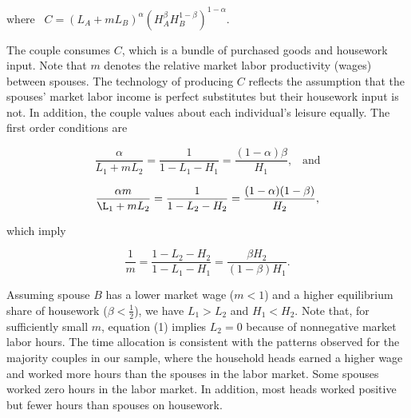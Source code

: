 \documentclass[12pt]{article}
\begin{document}
\begin{math}
\text{where} \;\;\; C = (L_A + mL_B)^\alpha(H_A^\beta H_B^{1-\beta})^{1-\alpha}.
\end{math}

The couple consumes $C$, which is a bundle of purchased goods and housework input. Note that $m$ denotes the relative market labor productivity (wages) between spouses. The technology of producing $C$ reflects the assumption that the spouses' market labor income is perfect substitutes but their housework input is not. In addition, the couple values about each individual's leisure equally. The first order conditions are

\begin{equation}
\frac{\alpha}{L_1 + mL_2} = \frac{1}{1 - L_1 - H_1} = \frac{(1-\alpha)\beta}{H_1}, \;\;\; \text{and}  \nonumber
\end{equation}

\begin{equation}
\frac{\alpha m}{\L_1 + mL_2} = \frac{1}{1 - L_2 - H_2} = \frac{(1-\alpha)(1-\beta)}{H_2}, \nonumber
\end{equation}

which imply 

\begin{equation}
\frac{1}{m} = \frac{1 - L_2 - H_2}{1 - L_1 - H_1} = \frac{\beta H_2}{(1-\beta) H_1}. 
\end{equation}


Assuming spouse $B$ has a lower market wage ($m < 1$) and a higher equilibrium share of housework ($\beta < \frac{1}{2}$), we have $L_1 > L_2$ and $H_1 < H_2$.  Note that, for sufficiently small $m$, equation (1) implies $L_2 = 0$ because of nonnegative market labor hours. The time allocation is consistent with the patterns observed for the majority couples in our sample, where the household heads earned a higher wage and worked more hours than the spouses in the labor market. Some spouses worked zero hours in the labor market. In addition, most heads worked positive but fewer hours than spouses on housework. 
\end{document}
